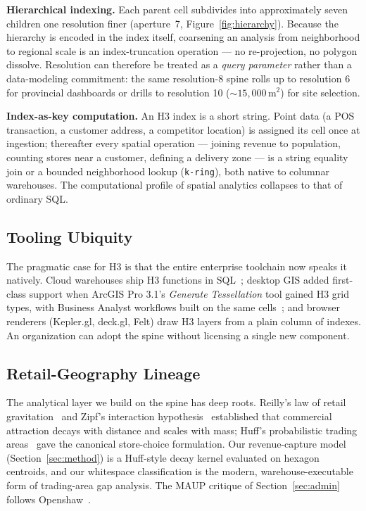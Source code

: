\documentclass[11pt,a4paper,twocolumn]{article}
\begin{document}
\textbf{Hierarchical indexing.} Each parent cell subdivides into
approximately seven children one resolution finer (aperture~7,
Figure~\ref{fig:hierarchy}). Because the hierarchy is encoded in the index
itself, coarsening an analysis from neighborhood to regional scale is an
index-truncation operation --- no re-projection, no polygon dissolve.
Resolution can therefore be treated as a \emph{query parameter} rather
than a data-modeling commitment: the same resolution-8 spine rolls up to
resolution 6 for provincial dashboards or drills to resolution 10
(${\sim}15{,}000$\,m$^2$) for site selection.

\textbf{Index-as-key computation.} An H3 index is a short string. Point
data (a POS transaction, a customer address, a competitor location) is
assigned its cell once at ingestion; thereafter every spatial operation ---
joining revenue to population, counting stores near a customer, defining a
delivery zone --- is a string equality join or a bounded neighborhood
lookup (\texttt{k-ring}), both native to columnar warehouses. The
computational profile of spatial analytics collapses to that of ordinary
SQL.

\subsection{Tooling Ubiquity}

The pragmatic case for H3 is that the entire enterprise toolchain now
speaks it natively. Cloud warehouses ship H3 functions in
SQL~\cite{snowflakeh3, bigqueryjslibs}; desktop GIS added first-class
support when ArcGIS Pro 3.1's \emph{Generate Tessellation} tool gained H3
grid types, with Business Analyst workflows built on the same
cells~\cite{crawford2023}; and browser renderers (Kepler.gl, deck.gl,
Felt) draw H3 layers from a plain column of indexes. An organization can
adopt the spine without licensing a single new component.

\subsection{Retail-Geography Lineage}

The analytical layer we build on the spine has deep roots. Reilly's law of
retail gravitation~\cite{reilly1931} and Zipf's interaction
hypothesis~\cite{zipf1946} established that commercial attraction decays
with distance and scales with mass; Huff's probabilistic trading
areas~\cite{huff1964} gave the canonical store-choice formulation. Our
revenue-capture model (Section~\ref{sec:method}) is a Huff-style decay
kernel evaluated on hexagon centroids, and our whitespace classification
is the modern, warehouse-executable form of trading-area gap analysis.
The MAUP critique of Section~\ref{sec:admin} follows
Openshaw~\cite{openshaw1984}.
\end{document}
